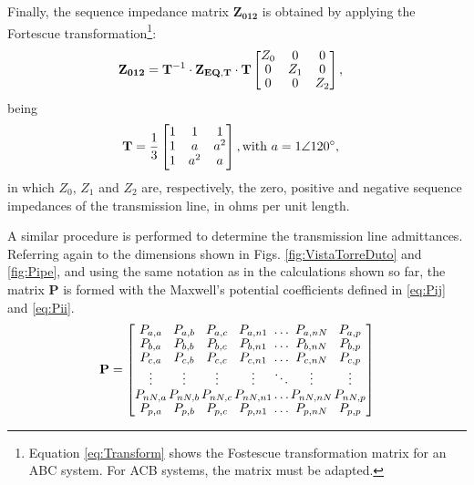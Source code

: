 \documentclass[conference]{IEEEtran}
\begin{document}
Finally, the sequence impedance matrix $\mathbf{Z_{012}}$ is obtained by applying the Fortescue transformation\footnote{Equation \eqref{eq:Transform} shows the Fostescue transformation matrix for an ABC system. For ACB systems, the matrix must be adapted.}:
\begin{equation}\label{eq:MatrizImpSeq}
	\begin{aligned}
		\arraycolsep=0.8pt %
		\medmuskip = -2mu %
		\def\arraystretch{1.2}
		&\mathbf{Z_{012}}
		=\mathbf{T}^{-1}
		\cdot\mathbf{Z_{EQ,T}}\cdot\mathbf{T}
		\begin{bmatrix}
			Z_0 & 0 & 0  \\
			0 & Z_1 & 0 \\
			0 & 0 & Z_2 \\
		\end{bmatrix},
	\end{aligned} 
\end{equation}
being
\begin{equation}\label{eq:Transform}
	\begin{aligned}
		\arraycolsep=0.8pt %
		\medmuskip = -2mu %
		\def\arraystretch{1.2}
		&\mathbf{T}
		=\frac{1}{3}
		\begin{bmatrix}
			1 & 1 & 1  \\
			1 & a & a^2 \\
			1 & a^2 & a \\
		\end{bmatrix}, \textrm{with}~ a=1\angle 120^\circ,
	\end{aligned} 
\end{equation}
in which $Z_0$, $Z_1$ and $Z_2$ are, respectively, the zero, positive and negative sequence impedances of the transmission line, in ohms per unit length.

A similar procedure is performed to determine the transmission line admittances. Referring again to the dimensions shown in Figs. \ref{fig:VistaTorreDuto} and \ref{fig:Pipe}, and using the same notation as in the calculations shown so far, the matrix $\mathbf{P}$ is formed with the Maxwell's potential coefficients defined in \eqref{eq:Pij} and \eqref{eq:Pii}.
\begin{equation}\label{eq:MatrizAdm}
	\arraycolsep=0.7pt %
	\medmuskip = -1mu %
	\def\arraystretch{.9}
	\mathbf{P}
	=
	\begin{bmatrix}
		P_{a,a} & P_{a,b} & P_{a,c} & P_{a,n1} & \ldots & P_{a,nN} & P_{a,p}  \\
		P_{b,a} & P_{b,b} & P_{b,c} & P_{b,n1} & \ldots & P_{b,nN} & P_{b,p}  \\
		P_{c,a} & P_{c,b} & P_{c,c} & P_{c,n1} & \ldots & P_{c,nN} & P_{c,p}  \\
		\vdots & \vdots & \vdots & \vdots & \ddots & \vdots & \vdots  \\
		P_{nN,a} & P_{nN,b} & P_{nN,c} & P_{nN,n1} & \ldots & P_{nN,nN} & P_{nN,p}  \\
		P_{p,a} & P_{p,b} & P_{p,c} & P_{p,n1} & \ldots & P_{p,nN} & P_{p,p}
	\end{bmatrix}
\end{equation}
\end{document}
